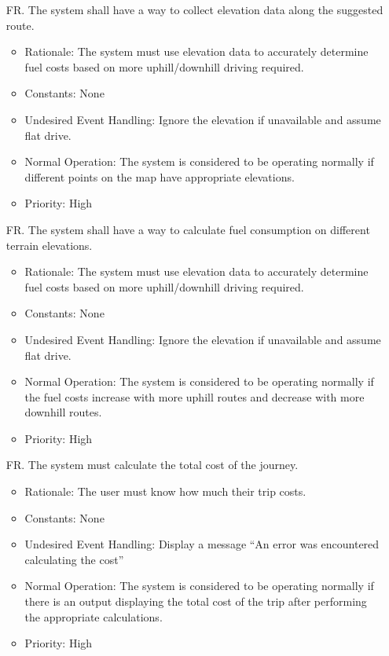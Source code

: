\documentclass[12pt]{article}
\newcounter{reqnum} %
\begin{document}
\begin{itemize}
\item[FR\refstepcounter{reqnum}\thereqnum. ] The system shall have a way to collect elevation data along the suggested route.
\begin{itemize}
    \item Rationale: The system must use elevation data to accurately determine fuel costs based on more uphill/downhill driving required.
    \item Constants: None
    \item Undesired Event Handling: Ignore the elevation if unavailable and assume flat drive.
    \item Normal Operation: The system is considered to be operating normally if different points on the map have appropriate elevations.
	\item Priority: High
\end{itemize}

\item[FR\refstepcounter{reqnum}\thereqnum. ] The system shall have a way to calculate fuel consumption on different terrain elevations.
\begin{itemize}
    \item Rationale: The system must use elevation data to accurately determine fuel costs based on more uphill/downhill driving required.
    \item Constants: None
    \item Undesired Event Handling: Ignore the elevation if unavailable and assume flat drive.
    \item Normal Operation: The system is considered to be operating normally if the fuel costs increase with more uphill routes and decrease with more downhill routes.
	\item Priority: High
\end{itemize}

\item[FR\refstepcounter{reqnum}\thereqnum. ] The system must calculate the total cost of the journey.
\begin{itemize}
    \item Rationale: The user must know how much their trip costs.
    \item Constants: None
    \item Undesired Event Handling: Display a message “An error was encountered calculating the cost”
    \item Normal Operation: The system is considered to be operating normally if there is an output displaying the total cost of the trip after performing the appropriate calculations.
	\item Priority: High
\end{itemize}

\end{itemize}
\end{document}
